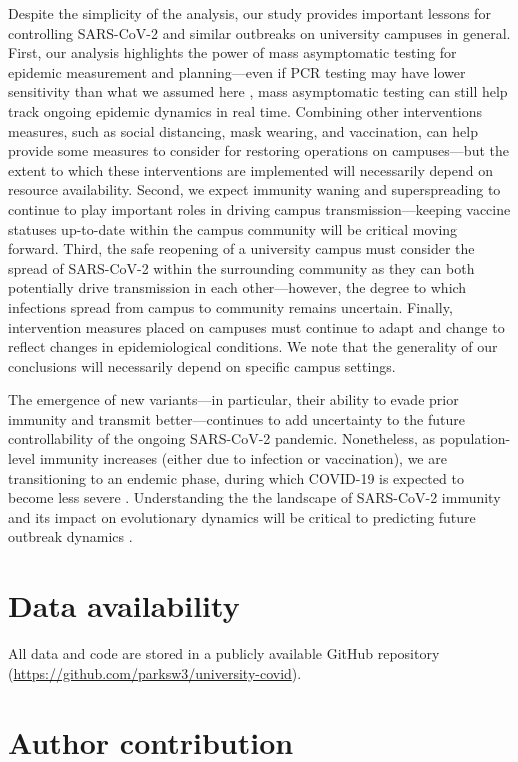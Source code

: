 \documentclass[12pt]{article}
\begin{document}
Despite the simplicity of the analysis, our study provides important lessons for controlling SARS-CoV-2 and similar outbreaks on university campuses in general.
First, our analysis highlights the power of mass asymptomatic testing for epidemic measurement and planning---even if PCR testing may have lower sensitivity than what we assumed here \citep{hellewell2021estimating}, mass asymptomatic testing can still help track ongoing epidemic dynamics in real time.
Combining other interventions measures, such as social distancing, mask wearing, and vaccination, can help provide some measures to consider for restoring operations on campuses---but the extent to which these interventions are implemented will necessarily depend on resource availability.
Second, we expect immunity waning and superspreading to continue to play important roles in driving campus transmission---keeping vaccine statuses up-to-date within the campus community will be critical moving forward.
Third, the safe reopening of a university campus must consider the spread of SARS-CoV-2 within the surrounding community as they can both potentially drive transmission in each other---however, the degree to which infections spread from campus to community remains uncertain.
Finally, intervention measures placed on campuses must continue to adapt and change to reflect changes in epidemiological conditions.
We note that the generality of our conclusions will necessarily depend on specific campus settings.

The emergence of new variants---in particular, their ability to evade prior immunity and transmit better---continues to add uncertainty to the future controllability of the ongoing SARS-CoV-2 pandemic.
Nonetheless, as population-level immunity increases (either due to infection or vaccination), we are transitioning to an endemic phase, during which COVID-19 is expected to become less severe \citep{lavine2021immunological}.
Understanding the the landscape of SARS-CoV-2 immunity and its impact on evolutionary dynamics will be critical to predicting future outbreak dynamics \citep{saad2020immune,baker2021limits}.

\section*{Data availability}

All data and code are stored in a publicly available GitHub repository (\url{https://github.com/parksw3/university-covid}).

\section*{Author contribution}
\end{document}
